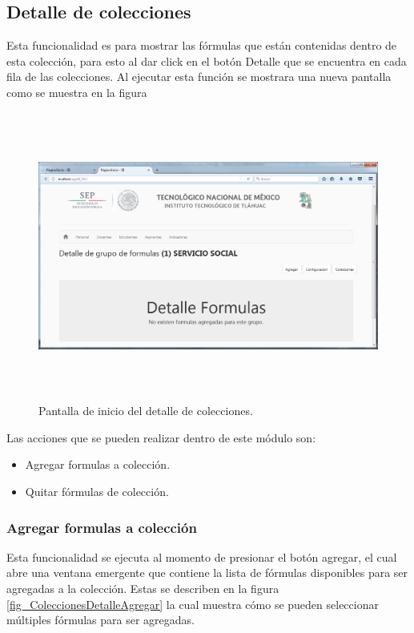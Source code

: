 		    \subsection{Detalle de colecciones}

		    Esta funcionalidad es para mostrar las f\'ormulas que est\'an contenidas dentro de esta colecci\'on, para esto al dar click en el bot\'on Detalle que se encuentra en cada fila de las colecciones. Al ejecutar esta funci\'on se mostrara una nueva pantalla como se muestra en la figura 

		    \begin{figure}[]
		        \centering
		        \includegraphics[width=16cm, height=9.5cm]{figuras/ColeccionesDetalle}
		        \caption{Pantalla de inicio del detalle de colecciones.}
		        \label{fig_ColeccionesDetalle}
		    \end{figure}

		    Las acciones que se pueden realizar dentro de este m\'odulo son:
		    \begin{itemize}
		    	\item Agregar formulas a colecci\'on.
		    	\item Quitar f\'ormulas de colecci\'on.
		    \end{itemize}

		    \subsubsection{Agregar formulas a colecci\'on}

		    	Esta funcionalidad se ejecuta al momento de presionar el bot\'on agregar, el cual abre una ventana emergente que contiene la lista de f\'ormulas disponibles para ser agregadas a la colecci\'on. Estas se describen en la figura \ref{fig_ColeccionesDetalleAgregar} la cual muestra c\'omo se pueden seleccionar m\'ultiples f\'ormulas para ser agregadas.\\

